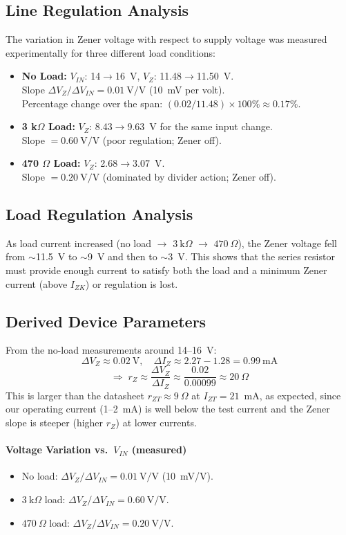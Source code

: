 \documentclass[12pt]{article}
\begin{document}
\subsection{Line Regulation Analysis}
The variation in Zener voltage with respect to supply voltage was measured
experimentally for three different load conditions:
\begin{itemize}
  \item \textbf{No Load:} $V_{IN}$: 14$\to$16~V, $V_{Z}$: 11.48$\to$11.50~V.\\
  Slope $\Delta V_Z / \Delta V_{IN} = 0.01~\text{V/V}$ (10~mV per volt).\\
  Percentage change over the span: $(0.02/11.48)\times 100\% \approx 0.17\%$.
  \item \textbf{3 k$\Omega$ Load:} $V_{Z}$: 8.43$\to$9.63~V for the same input change.\\
  Slope $= 0.60~\text{V/V}$ (poor regulation; Zener off).
  \item \textbf{470 $\Omega$ Load:} $V_{Z}$: 2.68$\to$3.07~V.\\
  Slope $= 0.20~\text{V/V}$ (dominated by divider action; Zener off).
\end{itemize}

\subsection{Load Regulation Analysis}
As load current increased (no load $\to$ $3~\text{k}\Omega$ $\to$ $470~\Omega$),
the Zener voltage fell from $\sim$11.5~V to $\sim$9~V and then to $\sim$3~V.
This shows that the series resistor must provide enough current to satisfy both
the load and a minimum Zener current (above $I_{ZK}$) or regulation is lost.

\subsection{Derived Device Parameters}
From the no-load measurements around 14--16~V:
\[
\Delta V_Z \approx 0.02~\text{V},\quad \Delta I_Z \approx 2.27-1.28=0.99~\text{mA}
\]
\[
\Rightarrow \; r_Z \approx \frac{\Delta V_Z}{\Delta I_Z} \approx
\frac{0.02}{0.00099} \approx 20~\Omega
\]
This is larger than the datasheet $r_{Z T}\approx 9~\Omega$ at $I_{Z T}=21$~mA,
as expected, since our operating current (1--2~mA) is well below the test
current and the Zener slope is steeper (higher $r_Z$) at lower currents.

\paragraph{Voltage Variation vs.\ $V_{IN}$ (measured)}
\begin{itemize}
  \item No load: $\Delta V_Z/\Delta V_{IN}=0.01~\text{V/V}$ (\SI{10}{mV/V}).
  \item $3~\text{k}\Omega$ load: $\Delta V_Z/\Delta V_{IN}=0.60~\text{V/V}$.
  \item $470~\Omega$ load: $\Delta V_Z/\Delta V_{IN}=0.20~\text{V/V}$.
\end{itemize}
\end{document}
